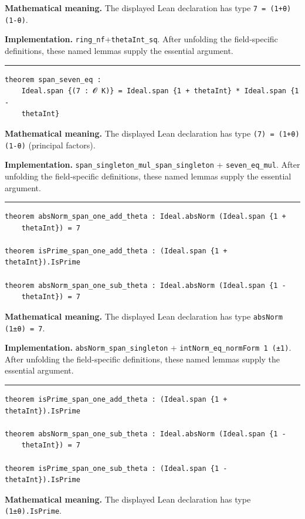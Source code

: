 \documentclass[UTF8,a4paper,11pt,fontset=fandol]{ctexart}
\theoremstyle{definition}
\newcommand{\statementsep}{\par\medskip\hrule\medskip}
\begin{document}
\noindent\textbf{Mathematical meaning.} The displayed Lean declaration has type \texttt{7 = (1+θ)(1-θ)}.\par
\noindent\textbf{Implementation.} \texttt{ring\_\allowbreak{}nf}+\texttt{thetaInt\_\allowbreak{}sq}. After unfolding the field-specific definitions, these named lemmas supply the essential argument.\par
\statementsep
\begin{verbatim}
theorem span_seven_eq :
    Ideal.span {(7 : 𝓞 K)} = Ideal.span {1 + thetaInt} * Ideal.span {1 -
    thetaInt}
\end{verbatim}
\noindent\textbf{Mathematical meaning.} The displayed Lean declaration has type \texttt{(7) = (1+θ)(1-θ)} (principal factors).\par
\noindent\textbf{Implementation.} \texttt{span\_\allowbreak{}singleton\_\allowbreak{}mul\_\allowbreak{}span\_\allowbreak{}singleton} + \texttt{seven\_\allowbreak{}eq\_\allowbreak{}mul}. After unfolding the field-specific definitions, these named lemmas supply the essential argument.\par
\statementsep
\begin{verbatim}
theorem absNorm_span_one_add_theta : Ideal.absNorm (Ideal.span {1 +
    thetaInt}) = 7

theorem isPrime_span_one_add_theta : (Ideal.span {1 + thetaInt}).IsPrime

theorem absNorm_span_one_sub_theta : Ideal.absNorm (Ideal.span {1 -
    thetaInt}) = 7
\end{verbatim}
\noindent\textbf{Mathematical meaning.} The displayed Lean declaration has type \texttt{absNorm (1±θ) = 7}.\par
\noindent\textbf{Implementation.} \texttt{absNorm\_\allowbreak{}span\_\allowbreak{}singleton} + \texttt{intNorm\_\allowbreak{}eq\_\allowbreak{}normForm 1 (±1)}. After unfolding the field-specific definitions, these named lemmas supply the essential argument.\par
\statementsep
\begin{verbatim}
theorem isPrime_span_one_add_theta : (Ideal.span {1 + thetaInt}).IsPrime

theorem absNorm_span_one_sub_theta : Ideal.absNorm (Ideal.span {1 -
    thetaInt}) = 7

theorem isPrime_span_one_sub_theta : (Ideal.span {1 - thetaInt}).IsPrime
\end{verbatim}
\noindent\textbf{Mathematical meaning.} The displayed Lean declaration has type \texttt{(1±θ).\allowbreak{}IsPrime}.\par
\end{document}
